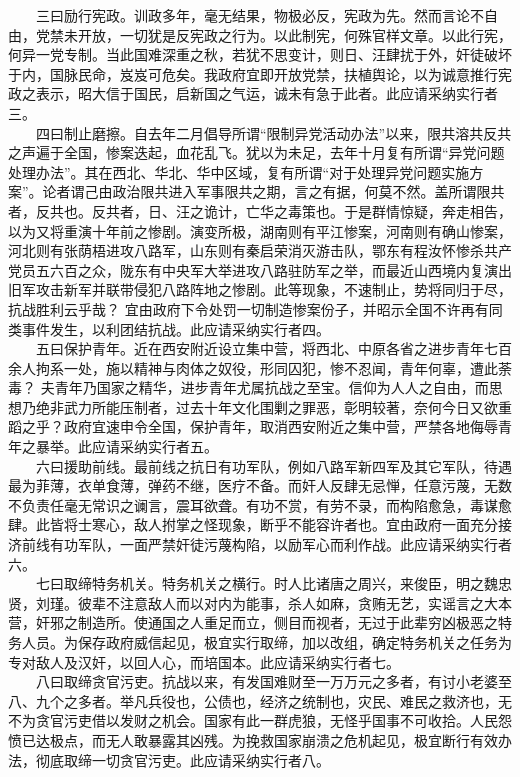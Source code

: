 \documentclass[cn,11pt,chinese]{elegantbook}
\begin{document}
　　三曰励行宪政。训政多年，毫无结果，物极必反，宪政为先。然而言论不自由，党禁未开放，一切犹是反宪政之行为。以此制宪，何殊官样文章。以此行宪，何异一党专制。当此国难深重之秋，若犹不思变计，则日、汪肆扰于外，奸徒破坏于内，国脉民命，岌岌可危矣。我政府宜即开放党禁，扶植舆论，以为诚意推行宪政之表示，昭大信于国民，启新国之气运，诚未有急于此者。此应请采纳实行者三。\\
　　四曰制止磨擦。自去年二月倡导所谓“限制异党活动办法”以来，限共溶共反共之声遍于全国，惨案迭起，血花乱飞。犹以为未足，去年十月复有所谓“异党问题处理办法”。其在西北、华北、华中区域，复有所谓“对于处理异党问题实施方案”。论者谓己由政治限共进入军事限共之期，言之有据，何莫不然。盖所谓限共者，反共也。反共者，日、汪之诡计，亡华之毒策也。于是群情惊疑，奔走相告，以为又将重演十年前之惨剧。演变所极，湖南则有平江惨案，河南则有确山惨案，河北则有张荫梧进攻八路军，山东则有秦启荣消灭游击队，鄂东有程汝怀惨杀共产党员五六百之众，陇东有中央军大举进攻八路驻防军之举，而最近山西境内复演出旧军攻击新军并联带侵犯八路阵地之惨剧。此等现象，不速制止，势将同归于尽，抗战胜利云乎哉？ 宜由政府下令处罚一切制造惨案份子，并昭示全国不许再有同类事件发生，以利团结抗战。此应请采纳实行者四。\\
　　五曰保护青年。近在西安附近设立集中营，将西北、中原各省之进步青年七百余人拘系一处，施以精神与肉体之奴役，形同囚犯，惨不忍闻，青年何辜，遭此荼毒？ 夫青年乃国家之精华，进步青年尤属抗战之至宝。信仰为人人之自由，而思想乃绝非武力所能压制者，过去十年文化围剿之罪恶，彰明较著，奈何今日又欲重蹈之乎？政府宜速申令全国，保护青年，取消西安附近之集中营，严禁各地侮辱青年之暴举。此应请采纳实行者五。\\
　　六曰援助前线。最前线之抗日有功军队，例如八路军新四军及其它军队，待遇最为菲薄，衣单食薄，弹药不继，医疗不备。而奸人反肆无忌惮，任意污蔑，无数不负责任毫无常识之谰言，震耳欲聋。有功不赏，有劳不录，而构陷愈急，毒谋愈肆。此皆将士寒心，敌人拊掌之怪现象，断乎不能容许者也。宜由政府一面充分接济前线有功军队，一面严禁奸徒污蔑构陷，以励军心而利作战。此应请采纳实行者六。\\
　　七曰取缔特务机关。特务机关之横行。时人比诸唐之周兴，来俊臣，明之魏忠贤，刘瑾。彼辈不注意敌人而以对内为能事，杀人如麻，贪贿无艺，实谣言之大本营，奸邪之制造所。使通国之人重足而立，侧目而视者，无过于此辈穷凶极恶之特务人员。为保存政府威信起见，极宜实行取缔，加以改组，确定特务机关之任务为专对敌人及汉奸，以回人心，而培国本。此应请采纳实行者七。\\
　　八曰取缔贪官污吏。抗战以来，有发国难财至一万万元之多者，有讨小老婆至八、九个之多者。举凡兵役也，公债也，经济之统制也，灾民、难民之救济也，无不为贪官污吏借以发财之机会。国家有此一群虎狼，无怪乎国事不可收拾。人民怨愤已达极点，而无人敢暴露其凶残。为挽救国家崩溃之危机起见，极宜断行有效办法，彻底取缔一切贪官污吏。此应请采纳实行者八。\\
\end{document}
